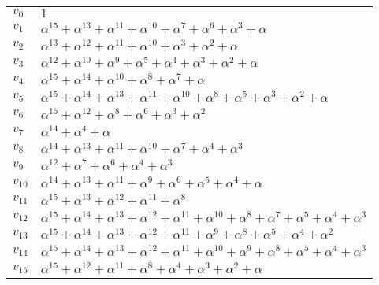 \begin{center}
  \begin{tabular}{ll}
    & \\
    \hline
    $v_0$ & $1$\\
    $v_1$ & $\alpha^{15} + \alpha^{13} + \alpha^{11} + \alpha^{10} + \alpha^7
    + \alpha^6 + \alpha^3 + \alpha$\\
    $v_2$ & $\alpha^{13} + \alpha^{12} + \alpha^{11} + \alpha^{10} + \alpha^3
    + \alpha^2 + \alpha$\\
    $v_3$ & $\alpha^{12} + \alpha^{10} + \alpha^9 + \alpha^5 + \alpha^4 +
    \alpha^3 + \alpha^2 + \alpha$\\
    $v_4$ & $\alpha^{15} + \alpha^{14} + \alpha^{10} + \alpha^8 + \alpha^7 +
    \alpha$\\
    $v_5$ & $\alpha^{15} + \alpha^{14} + \alpha^{13} + \alpha^{11} +
    \alpha^{10} + \alpha^8 + \alpha^5 + \alpha^3 + \alpha^2 + \alpha$\\
    $v_6$ & $\alpha^{15} + \alpha^{12} + \alpha^8 + \alpha^6 + \alpha^3 +
    \alpha^2$\\
    $v_7$ & $\alpha^{14} + \alpha^4 + \alpha$\\
    $v_8$ & $\alpha^{14} + \alpha^{13} + \alpha^{11} + \alpha^{10} + \alpha^7
    + \alpha^4 + \alpha^3$\\
    $v_9$ & $\alpha^{12} + \alpha^7 + \alpha^6 + \alpha^4 + \alpha^3$\\
    $v_{10}$ & $\alpha^{14} + \alpha^{13} + \alpha^{11} + \alpha^9 + \alpha^6
    + \alpha^5 + \alpha^4 + \alpha$\\
    $v_{11}$ & $\alpha^{15} + \alpha^{13} + \alpha^{12} + \alpha^{11} + \alpha^8$\\
    $v_{12}$ & $\alpha^{15} + \alpha^{14} + \alpha^{13} + \alpha^{12} + \alpha^{11} + \alpha^{10} + \alpha^8 + \alpha^7 + \alpha^5 + \alpha^4 + \alpha^3$\\
    $v_{13}$ & $\alpha^{15} + \alpha^{14} + \alpha^{13} + \alpha^{12} +
    \alpha^{11} + \alpha^9 + \alpha^8 + \alpha^5 + \alpha^4 + \alpha^2$\\
    $v_{14}$ & $\alpha^{15} + \alpha^{14} + \alpha^{13} + \alpha^{12} +
    \alpha^{11} + \alpha^{10} + \alpha^9 + \alpha^8 + \alpha^5 + \alpha^4 +
    \alpha^3$\\
    $v_{15}$ & $\alpha^{15} + \alpha^{12} + \alpha^{11} + \alpha^8 + \alpha^4
    + \alpha^3 + \alpha^2 + \alpha$\\
    \hline
  \end{tabular}
\end{center}

